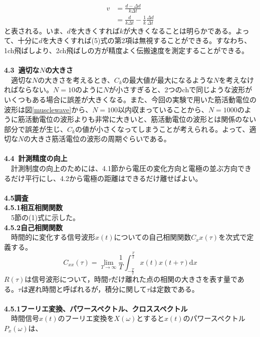 \documentclass[a4paper,10.5pt]{ltjsarticle}
\begin{document}
\begin{align}
  v&=\frac{d-\Delta d}{k\Delta t}\nonumber\\[10pt]
  &=\frac{d}{k\Delta t}-\frac{1}{k}\frac{\Delta d}{\Delta t}
\end{align}
と表される。いま、$d$を大きくすれば$k$が大きくなることは明らかである。よって、十分に$d$を大きくすれば(5)式の第2項は無視することができる。すなわち、1ch飛ばしより、2ch飛ばしの方が精度よく伝搬速度を測定することができる。　\\
\\
{\large \bfseries 4.3\ 適切な$N$の大きさ}\\
　適切な$N$の大きさを考えるとき、$C_k$の最大値が最大になるような$N$を考えなければならない。$N=10$のように$N$が小さすぎると、2つのchで同じような波形がいくつもある場合に誤差が大きくなる。また、今回の実験で用いた筋活動電位の波形は図\ref{musclewave}から、$N=100$以内収まっていることから、$N=1000$のように筋活動電位の波形よりも非常に大きいと、筋活動電位の波形とは関係のない部分で誤差が生じ、$C_k$の値が小さくなってしまうことが考えられる。よって、適切な$N$の大きさ筋活電位の波形の周期ぐらいである。\\
\\
{\large \bfseries 4.4\ 計測精度の向上}\\
　計測制度の向上のためには、4.1節から電圧の変化方向と電極の並ぶ方向できるだけ平行にし、4.2から電極の距離はできるだけ離せばよい。\\
\\
{\large \bfseries 4.5調査}\\
{\large \bfseries 4.5.1相互相関関数}\\
　5節の(1)式に示した。\\
\clearpage
{\large \bfseries 4.5.2自己相関関数}\cite{autocorrelation}\\
　時間的に変化する信号波形$x(t)$についての自己相関関数$C_xx(\tau)$を次式で定義する。
\begin{equation}
  C_{xx}(\tau)=\lim_{T\rightarrow\infty}\frac{1}{T}\int_{-\frac{T}{2}}^{\frac{T}{2}}{x(t)x(t+\tau)}\mathrm{d}x
\end{equation}
$R(\tau)$は信号波形について，時間$\tau$だけ離れた点の相関の大きさを表す量である。$\tau$は遅れ時間と呼ばれるが，積分に関して$\tau$は定数である。\\
\\
{\large \bfseries 4.5.1フーリエ変換、パワースペクトル、クロススペクトル}\cite{onosokki}\cite{OsakaUniversity}\\
　時間信号$x(t)$のフーリエ変換を$X(\omega)$とすると$x(t)$のパワースペクトル$P_x(\omega)$は、
\end{document}
